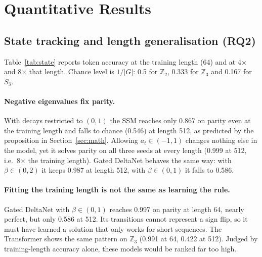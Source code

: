 \section{Quantitative Results}
\label{sec:quant}

\subsection{State tracking and length generalisation (RQ2)}
Table~\ref{tab:state} reports token accuracy at the training length (64) and at 4$\times$ and 8$\times$ that
length. Chance level is $1/|G|$: 0.5 for $\mathbb{Z}_2$, 0.333 for $\mathbb{Z}_3$ and 0.167 for $S_3$.

\begin{table}[htbp]\centering
\resizebox{\linewidth}{!}{}
\caption{RQ2: token accuracy on group word problems (mean $\pm$ std over 3 seeds). Models are trained on length
64 and tested on lengths 64, 256 and 512. Bold: within 0.005 of the best in the column. The lower block contains
the two extensions. All recurrent models have the same state size (8192 floats).}
\label{tab:state}
\end{table}

\paragraph{Negative eigenvalues fix parity.} With decays restricted to $(0,1)$ the SSM reaches only 0.867 on
parity even at the training length and falls to chance (0.546) at length 512, as predicted by the proposition
in Section~\ref{sec:math}. Allowing $a_t\in(-1,1)$ changes nothing else in the model, yet it solves parity on all
three seeds at every length (0.999 at 512, i.e.\ 8$\times$ the training length). Gated DeltaNet behaves the same
way: with $\beta\in(0,2)$ it keeps 0.987 at length 512, with $\beta\in(0,1)$ it falls to 0.586.

\paragraph{Fitting the training length is not the same as learning the rule.} Gated DeltaNet with
$\beta\in(0,1)$ reaches 0.997 on parity at length 64, nearly perfect, but only 0.586 at 512. Its transitions
cannot represent a sign flip, so it must have learned a solution that only works for short sequences. The
Transformer shows the same pattern on $\mathbb{Z}_3$ (0.991 at 64, 0.422 at 512). Judged by training-length
accuracy alone, these models would be ranked far too high.

